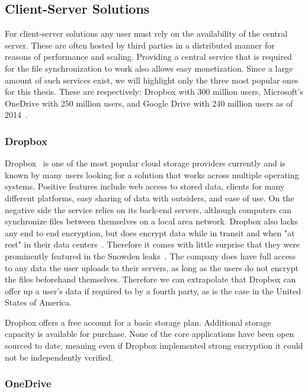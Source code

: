 \subsection{Client-Server Solutions}
\label{sub:Client-Server Solutions}

For client-server solutions any user must rely on the availability of the central server.
These are often hosted by third parties in a distributed manner for reasons of performance and scaling.
Providing a central service that is required for the file synchronization to work also allows easy monetization.
Since a large amount of such services exist, we will highlight only the three most popular ones for this thesis.
These are respectively: Dropbox with 300 million users, Microsoft's OneDrive with 250 million users, and Google Drive with 240 million users as of 2014~\cite{web:site:fortune}.

\subsubsection{Dropbox}
\label{subs:Dropbox}

Dropbox~\cite{web:site:dropbox} is one of the most popular cloud storage providers currently and is known by many users looking for a solution that works across multiple operating systems.
Positive features include web access to stored data, clients for many different platforms, easy sharing of data with outsiders, and ease of use.
On the negative side the service relies on its back-end servers, although computers can synchronize files between themselves on a local area network.
Dropbox also lacks any end to end encryption, but does encrypt data while in transit and when "at rest" in their data centers~\cite{web:site:dropbox:blog}.
Therefore it comes with little surprise that they were prominently featured in the Snowden leaks~\cite{web:site:rt:dropbox}.
The company does have full access to any data the user uploads to their servers, as long as the users do not encrypt the files beforehand themselves.
Therefore we can extrapolate that Dropbox can offer up a user's data if required to by a fourth party, as is the case in the United States of America.

Dropbox offers a free account for a basic storage plan.
Additional storage capacity is available for purchase.
None of the core applications have been open sourced to date, meaning even if Dropbox implemented strong encryption it could not be independently verified.

\subsubsection{OneDrive}
\label{subs:OneDrive}

